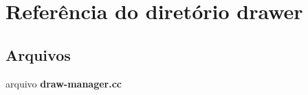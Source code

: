 \section{Referência do diretório drawer}
\label{dir_468db64e3b7991c88e973b70b45f4a66}
\subsection*{Arquivos}
\begin{DoxyCompactItemize}
\item 
arquivo {\bf draw-\/manager.\+cc}
\end{DoxyCompactItemize}
